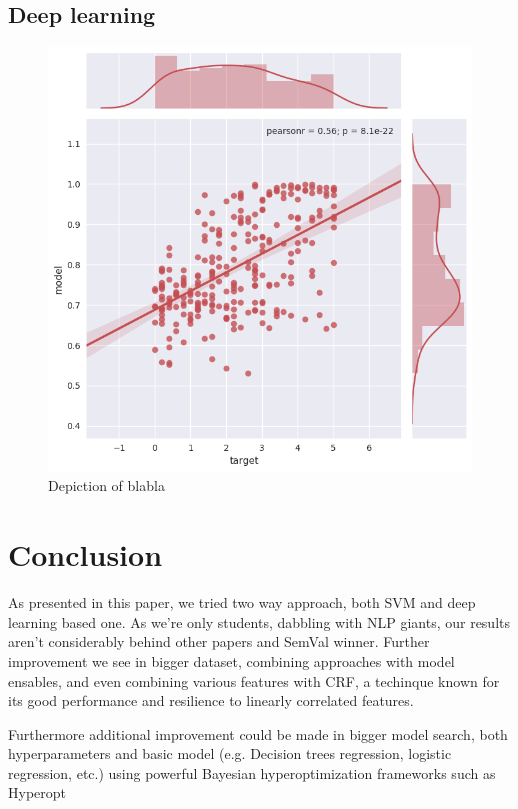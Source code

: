\documentclass[10pt, a4paper]{article}
\begin{document}
\subsection{Deep learning}


\newpage
\begin{figure}
\begin{center}
\includegraphics[width=\columnwidth]{only_2nd_layer.png}
\caption{Depiction of blabla}
\label{fig:lstm_2nd_layer}
\end{center}
\end{figure}



\section{Conclusion}

As presented in this paper, we tried two way approach, both SVM and deep learning based one. As we're only students, dabbling with NLP giants, our results aren't considerably behind other papers and SemVal winner. Further improvement we see in bigger dataset, combining approaches with model ensables, and even combining various features with CRF, a techinque known for its good performance and resilience to linearly correlated features.

Furthermore additional improvement could be made in bigger model search, both hyperparameters and basic model (e.g. Decision trees regression, logistic regression, etc.) using powerful Bayesian hyperoptimization frameworks such as Hyperopt~\citep{bergstra2013hyperopt}



\nocite{*}
\end{document}
